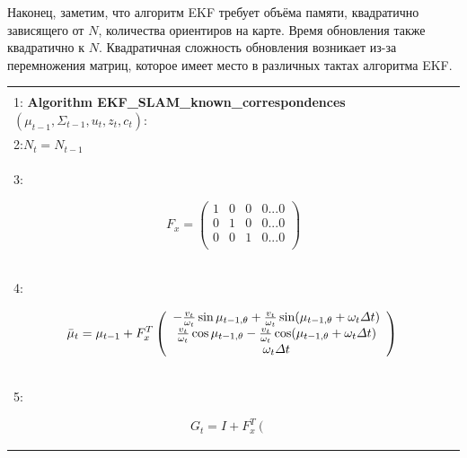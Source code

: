 \documentclass[10pt,a4paper]{article}
\begin{document}
Наконец, заметим, что алгоритм EKF требует объёма памяти, квадратично зависящего от $N$, количества ориентиров на карте. Время обновления также квадратично к $N$. Квадратичная сложность обновления возникает из-за перемножения матриц, которое имеет место в различных тактах алгоритма EKF.

\begin{table}[H]
\begin{center}
\begin{tabular}{|l|}
\hline
{}\\
1: \textbf{Algorithm EKF\_SLAM\_known\_correspondences}$(\mu_{t-1},\varSigma_{t-1},u_t,z_t,c_t):$ \\
2:\hspace{5mm}$N_t=N_{t-1}$\\
3:\hspace{5mm}
\begin{minipage}{0.2\textwidth}
				\begin{equation*}
				F_x=\left(\begin{array}{cccc} 1&0&0&0...0\\
				0&1&0&0...0\\
				0&0&1&0...0\\ 
				\end{array} \right)
				\end{equation*}
\end{minipage}\\
4:\hspace{5mm}
\begin{minipage}{0.2\textwidth}
				\begin{equation*}
				\bar{\mu}_t=\mu_{t-1}+F_x^T\left(\begin{array}{c} 
				-\frac{v_t}{\omega_t}\sin \mu_{t-1,\theta}+\frac{v_t}{\omega_t}\sin(\mu_{t-1,\theta}+\omega_t\varDelta t)\\
				\frac{v_t}{\omega_t}\cos\mu_{t-1,\theta}-\frac{v_t}{\omega_t}\cos(\mu_{t-1,\theta}+\omega_t\varDelta t)\\
				\omega_t\varDelta t\\ 
				\end{array} \right)\\
				\end{equation*}
\end{minipage}\\
5:\hspace{5mm}
\begin{minipage}{0.2\textwidth}
				\begin{equation*}
				G_t=I+F_x^T\left(\begin{array}{ccc} 

\end{array}
\end{equation*}
\end{minipage}
\end{tabular}
\end{center}
\end{table}
\end{document}

